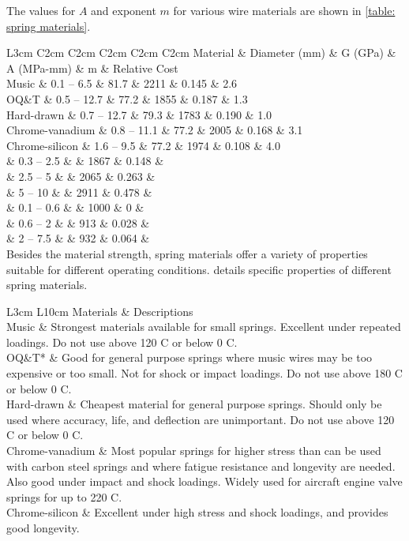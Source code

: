 \documentclass[a4paper,openany,nobib]{tufte-book}
\begin{document}
{{The values for \(A\) and exponent \(m\) for various wire materials are shown
in \ref{table: spring materials}.


 L3cm C2cm C2cm C2cm C2cm C2cm Material \& Diameter (mm) \& G (GPa) \& A
(MPa-mm) \& m \& Relative Cost\\
Music \& 0.1 -- 6.5 \& 81.7 \& 2211 \& 0.145 \& 2.6\\
OQ\&T \& 0.5 -- 12.7 \& 77.2 \& 1855 \& 0.187 \& 1.3\\
Hard-drawn \& 0.7 -- 12.7 \& 79.3 \& 1783 \& 0.190 \& 1.0\\
Chrome-vanadium \& 0.8 -- 11.1 \& 77.2 \& 2005 \& 0.168 \& 3.1\\
Chrome-silicon \& 1.6 -- 9.5 \& 77.2 \& 1974 \& 0.108 \& 4.0\\
\& 0.3 -- 2.5 \& \& 1867 \& 0.148 \&\\
\& 2.5 -- 5 \& \& 2065 \& 0.263 \&\\
\& 5 -- 10 \& \& 2911 \& 0.478 \&\\
\& 0.1 -- 0.6 \& \& 1000 \& 0 \&\\
\& 0.6 -- 2 \& \& 913 \& 0.028 \&\\
\& 2 -- 7.5 \& \& 932 \& 0.064 \&\\

Besides the material strength, spring materials offer a variety of
properties suitable for different operating conditions. details specific
properties of different spring materials.


 L3cm L10cm Materials \& Descriptions\\
Music \& Strongest materials available for small springs. Excellent under
repeated loadings. Do not use above 120 C or below 0 C.\\
OQ\&T* \& Good for general purpose springs where music wires may be too
expensive or too small. Not for shock or impact loadings. Do not use
above 180 C or below 0 C.\\
Hard-drawn \& Cheapest material for general purpose springs. Should only
be used where accuracy, life, and deflection are unimportant. Do not use
above 120 C or below 0 C.\\
Chrome-vanadium \& Most popular springs for higher stress than can be
used with carbon steel springs and where fatigue resistance and
longevity are needed. Also good under impact and shock loadings. Widely
used for aircraft engine valve springs for up to 220 C.\\
Chrome-silicon \& Excellent under high stress and shock loadings, and
provides good longevity.\\

}}
\end{document}
